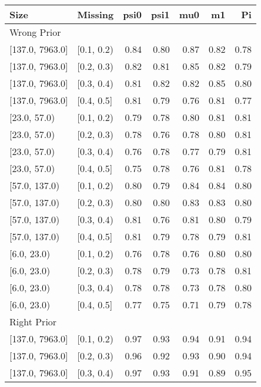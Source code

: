 \begin{table}[ht]
\centering
\begin{tabular}{llrrrrr}
  \toprule
Size & Missing & psi0 & psi1 & mu0 & m1 & Pi \\ 
  \midrule
\multicolumn{7}{l}{Wrong Prior}\\
{[137.0, 7963.0]} & {[0.1, 0.2)} & 0.84 & 0.80 & 0.87 & 0.82 & 0.78 \\ 
  {[137.0, 7963.0]} & {[0.2, 0.3)} & 0.82 & 0.81 & 0.85 & 0.82 & 0.79 \\ 
  {[137.0, 7963.0]} & {[0.3, 0.4)} & 0.81 & 0.82 & 0.82 & 0.85 & 0.80 \\ 
  {[137.0, 7963.0]} & {[0.4, 0.5]} & 0.81 & 0.79 & 0.76 & 0.81 & 0.77 \\ 
  {[23.0, 57.0)} & {[0.1, 0.2)} & 0.79 & 0.78 & 0.80 & 0.81 & 0.81 \\ 
  {[23.0, 57.0)} & {[0.2, 0.3)} & 0.78 & 0.76 & 0.78 & 0.80 & 0.81 \\ 
  {[23.0, 57.0)} & {[0.3, 0.4)} & 0.76 & 0.78 & 0.77 & 0.79 & 0.81 \\ 
  {[23.0, 57.0)} & {[0.4, 0.5]} & 0.75 & 0.78 & 0.76 & 0.81 & 0.78 \\ 
  {[57.0, 137.0)} & {[0.1, 0.2)} & 0.80 & 0.79 & 0.84 & 0.84 & 0.80 \\ 
  {[57.0, 137.0)} & {[0.2, 0.3)} & 0.80 & 0.80 & 0.83 & 0.83 & 0.80 \\ 
  {[57.0, 137.0)} & {[0.3, 0.4)} & 0.81 & 0.76 & 0.81 & 0.80 & 0.79 \\ 
  {[57.0, 137.0)} & {[0.4, 0.5]} & 0.81 & 0.79 & 0.78 & 0.79 & 0.81 \\ 
  {[6.0, 23.0)} & {[0.1, 0.2)} & 0.76 & 0.78 & 0.76 & 0.80 & 0.80 \\ 
  {[6.0, 23.0)} & {[0.2, 0.3)} & 0.78 & 0.79 & 0.73 & 0.78 & 0.81 \\ 
  {[6.0, 23.0)} & {[0.3, 0.4)} & 0.78 & 0.78 & 0.73 & 0.78 & 0.80 \\ 
  {[6.0, 23.0)} & {[0.4, 0.5]} & 0.77 & 0.75 & 0.71 & 0.79 & 0.78 \\ 
   \midrule
\multicolumn{7}{l}{Right Prior}\\
{[137.0, 7963.0]} & {[0.1, 0.2)} & 0.97 & 0.93 & 0.94 & 0.91 & 0.94 \\ 
  {[137.0, 7963.0]} & {[0.2, 0.3)} & 0.96 & 0.92 & 0.93 & 0.90 & 0.94 \\ 
  {[137.0, 7963.0]} & {[0.3, 0.4)} & 0.97 & 0.93 & 0.91 & 0.89 & 0.95 \\ 

\end{tabular}
\end{table}
